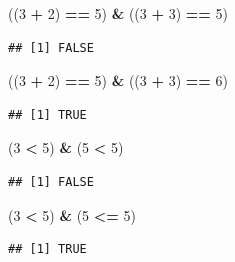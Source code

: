 \documentclass[
]{book}
\newenvironment{Shaded}{\begin{snugshade}}{\end{snugshade}}
\newcommand{\DecValTok}[1]{\textcolor[rgb]{0.00,0.00,0.81}{#1}}
\newcommand{\NormalTok}[1]{#1}
\newcommand{\OperatorTok}[1]{\textcolor[rgb]{0.81,0.36,0.00}{\textbf{#1}}}
\newcommand{\StringTok}[1]{\textcolor[rgb]{0.31,0.60,0.02}{#1}}
\begin{document}
\begin{Shaded}
\begin{Highlighting}[]
\NormalTok{((}\DecValTok{3} \OperatorTok{+}\StringTok{ }\DecValTok{2}\NormalTok{) }\OperatorTok{==}\StringTok{ }\DecValTok{5}\NormalTok{) }\OperatorTok{&}\StringTok{ }\NormalTok{((}\DecValTok{3} \OperatorTok{+}\StringTok{ }\DecValTok{3}\NormalTok{) }\OperatorTok{==}\StringTok{ }\DecValTok{5}\NormalTok{)}
\end{Highlighting}
\end{Shaded}

\begin{verbatim}
## [1] FALSE
\end{verbatim}

\begin{Shaded}
\begin{Highlighting}[]
\NormalTok{((}\DecValTok{3} \OperatorTok{+}\StringTok{ }\DecValTok{2}\NormalTok{) }\OperatorTok{==}\StringTok{ }\DecValTok{5}\NormalTok{) }\OperatorTok{&}\StringTok{ }\NormalTok{((}\DecValTok{3} \OperatorTok{+}\StringTok{ }\DecValTok{3}\NormalTok{) }\OperatorTok{==}\StringTok{ }\DecValTok{6}\NormalTok{)}
\end{Highlighting}
\end{Shaded}

\begin{verbatim}
## [1] TRUE
\end{verbatim}

\begin{Shaded}
\begin{Highlighting}[]
\NormalTok{(}\DecValTok{3} \OperatorTok{<}\StringTok{ }\DecValTok{5}\NormalTok{) }\OperatorTok{&}\StringTok{ }\NormalTok{(}\DecValTok{5} \OperatorTok{<}\StringTok{ }\DecValTok{5}\NormalTok{)}
\end{Highlighting}
\end{Shaded}

\begin{verbatim}
## [1] FALSE
\end{verbatim}

\begin{Shaded}
\begin{Highlighting}[]
\NormalTok{(}\DecValTok{3} \OperatorTok{<}\StringTok{ }\DecValTok{5}\NormalTok{) }\OperatorTok{&}\StringTok{ }\NormalTok{(}\DecValTok{5} \OperatorTok{<=}\StringTok{ }\DecValTok{5}\NormalTok{)}
\end{Highlighting}
\end{Shaded}

\begin{verbatim}
## [1] TRUE
\end{verbatim}
\end{document}
